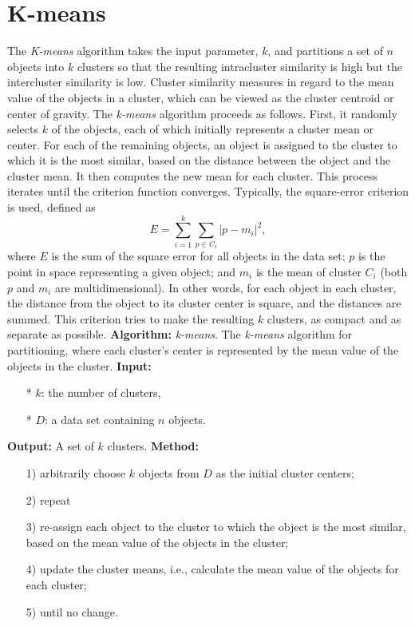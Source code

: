 \section{K-means}
The \textit{K-means} algorithm takes the input parameter, $k$, and partitions a set of $n$ objects into $k$ clusters so that the resulting intracluster similarity is high but the intercluster similarity is low.  Cluster similarity measures in regard to the mean value of the objects in a cluster, which can be viewed as the cluster centroid or center of gravity.
The \textit{k-means} algorithm proceeds as follows.  First, it randomly selects $k$ of the objects, each of which initially represents a cluster mean or center.  For each of the remaining objects, an object is assigned to the cluster to which it is the most similar, based on the distance between the object and the cluster mean.  It then computes the new mean for each cluster.  This process iterates until the criterion function converges.  Typically, the square-error criterion 	is used, defined as
$$E=\sum_{i=1}^{k}\sum_{p\in C_{i}}\vert p-m_{i}\vert^{2},$$
where $E$ is the sum of the square error for all objects in the data set; $p$ is the point in space representing a given object; and $m_{i}$ is the mean of cluster $C_{i}$ (both $p$ and $m_{i}$ are multidimensional).
In other words, for each object in each cluster, the distance from the object to its cluster center is square, and the distances are summed.
This criterion tries to make the resulting $k$ clusters, as compact and as separate as possible.
\textbf{Algorithm:} \textit{k-means}.  The \textit{k-means} algorithm for partitioning, where each cluster's center is represented by the mean value of the objects in the cluster.
\textbf{Input:}
\begin{itemize}
\item[*] $k$: the number of clusters,
\item[*] $D$: a data set containing $n$ objects.
\end{itemize}
\textbf{Output:} A set of $k$ clusters.
\textbf{Method:}
\begin{itemize}
\item[1)] arbitrarily choose $k$ objects from $D$ as the initial cluster centers;
\item[2)] repeat
\item[3)] re-assign each object to the cluster to which the object is the most similar, based on the mean value of the objects in the cluster;
\item[4)] update the cluster means, i.e., calculate the mean value of the objects for each cluster;
\item[5)] until no change.
\end{itemize}

